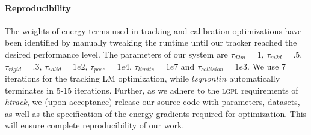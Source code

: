 \paragraph{Reproducibility}
% 
The weights of energy terms used in tracking and calibration optimizations have been identified by manually tweaking the runtime until our tracker reached the desired performance level. 
The parameters of our system are $\tau_{d2m}=1$, $\tau_{m2d}=.5$, $\tau_{rigid}=.3$, $\tau_{valid}=1e2$, $\tau_{pose}=1e4$, $\tau_{limits}=1e7$ and $\tau_{collision}=1e3$. We use 7 iterations for the tracking LM optimization, while $lsqnonlin$ automatically terminates in 5-15 iterations. Further, as we adhere to the \textsc{lgpl} requirements of \emph{htrack}, we (upon acceptance) release our source code with parameters, datasets, as well as the specification of the energy gradients required for optimization. This will ensure complete reproducibility of our work.